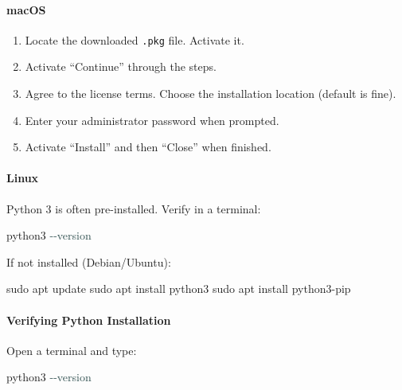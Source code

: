 \documentclass[
  justified,
  openright,
]{tufte-book}
\let\subsubsection\paragraph
\let\paragraph\paragraph
\newcommand{\AttributeTok}[1]{\textcolor{DarkSlateGray}{#1}}
\newcommand{\ExtensionTok}[1]{#1}
\newcommand{\FunctionTok}[1]{\textcolor{BrandBlue}{#1}}
\newcommand{\NormalTok}[1]{#1}
\newenvironment{Shaded}{%
  \begin{snugshade}
}{%
  \end{snugshade}
}
\let\subsubsection\paragraph
\let\paragraph\paragraph
\providecommand{\tightlist}{%
  \setlength{\itemsep}{0pt}\setlength{\parskip}{0pt}}
\begin{document}
\paragraph{macOS}\label{macos}

\begin{enumerate}
\def\labelenumi{\arabic{enumi}.}
\tightlist
\item
  Locate the downloaded \texttt{.pkg} file. Activate it.
\item
  Activate ``Continue'' through the steps.
\item
  Agree to the license terms. Choose the installation location (default
  is fine).
\item
  Enter your administrator password when prompted.
\item
  Activate ``Install'' and then ``Close'' when finished.
\end{enumerate}

\paragraph{Linux}\label{linux}

Python 3 is often pre-installed. Verify in a terminal:

\begin{Shaded}
\begin{Highlighting}[]
\ExtensionTok{python3} \AttributeTok{{-}{-}version}
\end{Highlighting}
\end{Shaded}

If not installed (Debian/Ubuntu):

\begin{Shaded}
\begin{Highlighting}[]
\FunctionTok{sudo}\NormalTok{ apt update}
\FunctionTok{sudo}\NormalTok{ apt install python3}
\FunctionTok{sudo}\NormalTok{ apt install python3{-}pip}
\end{Highlighting}
\end{Shaded}

\subsubsection{Verifying Python
Installation}\label{verifying-python-installation}

Open a terminal and type:

\begin{Shaded}
\begin{Highlighting}[]
\ExtensionTok{python3} \AttributeTok{{-}{-}version}
\end{Highlighting}
\end{Shaded}
\end{document}
